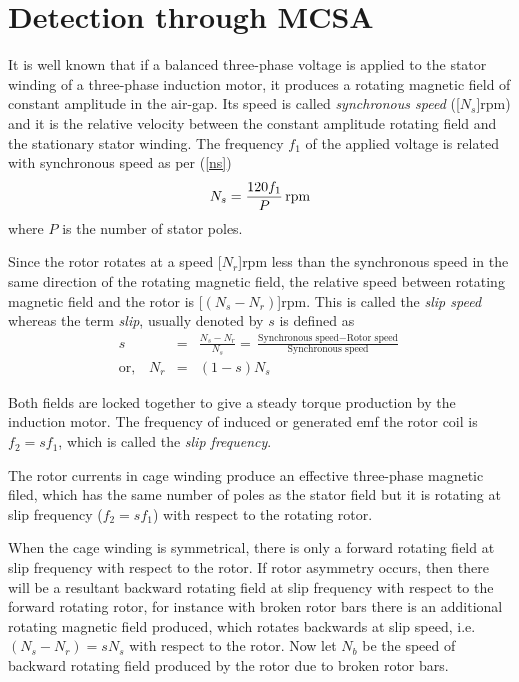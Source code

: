 \documentclass[a4paper,11pt]{report}
\begin{document}
\section{Detection through MCSA}
It is well known that if a balanced three-phase voltage is applied to the stator winding of a three-phase induction motor, it produces a rotating magnetic field of constant amplitude in the air-gap. Its speed is called \emph{synchronous speed} (\unit[$N_{s}$]{rpm}) and it is the relative velocity between the constant amplitude rotating field and the stationary stator winding. The frequency $f_{1}$ of the applied voltage is related with synchronous speed as per (\ref{ns})
\begin{equation}
N_{s} = \unit[\frac{120f_{1}}{P}]{rpm} \label{ns}
\end{equation}
where $P$ is the number of stator poles.

Since the rotor rotates at a speed \unit[$N_{r}$]{rpm} less than the synchronous speed in the same direction of the rotating magnetic field, the relative speed between rotating magnetic field and the rotor is \unit[$(N_{s} - N_{r})$]{rpm}. This is called the \emph{slip speed} whereas the term \emph{slip}, usually denoted by $s$ is defined as
\begin{eqnarray*}
s &=& \frac{N_{s}-N_{r}}{N_{s}}=\frac{\textrm{Synchronous speed}-\textrm{Rotor speed}}{\textrm{Synchronous speed}} \\
\textrm{or,} \quad N_{r} &=& (1-s)N_{s}
\end{eqnarray*}

Both fields are locked together to give a steady torque production by the induction motor. The frequency of induced or generated emf the rotor coil is $f_{2}=sf_{1}$, which is called the \emph{slip frequency}.

The rotor currents in cage winding produce an effective three-phase magnetic filed, which has the same number of poles as the stator field but it is rotating at slip frequency ($f_{2}=sf_{1}$) with respect to the rotating rotor. 

When the cage winding is symmetrical, there is only a forward rotating field at slip frequency with respect to the rotor. If rotor asymmetry occurs, then there will be a resultant backward rotating field at slip frequency with respect to the forward rotating rotor, for instance with broken rotor bars there is an additional rotating magnetic field produced, which rotates backwards at slip speed, i.e. $(N_{s} - N_{r}) = sN_{s}$ with respect to the rotor.
Now let $N_{b}$ be the speed of backward rotating field produced by the rotor due to broken rotor bars.
\end{document}
